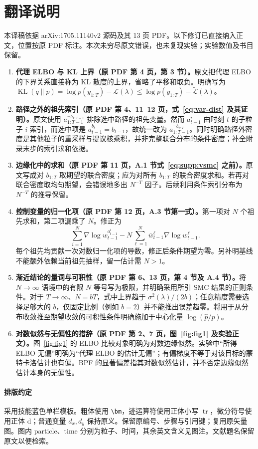 \clearpage
\section*{翻译说明}
\label{translation:notes}
本译稿依据 arXiv:1705.11140v2 源码及其 13 页 PDF。以下修订已直接纳入正文，位置按原 PDF 标注。本次未穷尽原文错误，也未复现实验；实验数值及书目保留。

\begin{enumerate}
\item \textbf{代理 ELBO 与 KL 上界（原 PDF 第 4 页，第 3 节）。}原文把代理 ELBO 的下界关系直接称为 KL 散度的上界，省略了平移和取负。明确写为 $\operatorname{KL}(q\|p)=\log p(y_{1:T})-\mathcal L(\lambda)\leq\log p(y_{1:T})-\widetilde{\mathcal L}(\lambda)$。
\item \textbf{路径之外的祖先索引（原 PDF 第 4、11–12 页，式~\eqref{eq:var-dist} 及其证明）。}原文使用 $a_{1:T-1}^{\neg b_{1:T-1}}$ 排除选中路径的祖先变量。然而 $a_{t-1}^i$ 由时刻 $t$ 的子粒子 $i$ 索引，而选中项是 $a_{t-1}^{b_t}=b_{t-1}$，故统一改为 $a_{1:T-1}^{\neg b_{2:T}}$。同时明确路径外密度是其他粒子的重采样与提议核乘积，并非完整联合分布的条件密度；补全附录末步的索引求和依据。
\item \textbf{边缘化中的求和（原 PDF 第 11 页，A.1 节式~\eqref{eq:supp:vsmc} 之前）。}原文写成对 $b_{1:T}$ 取期望的联合密度；应为对所有 $b_{1:T}$ 的联合密度求和。若再对联合密度取均匀期望，会错误地多出 $N^{-T}$ 因子。后续利用条件索引分布为 $N^{-T}$ 的推导保留。
\item \textbf{控制变量的归一化项（原 PDF 第 12 页，A.3 节第一式）。}第一项对 $N$ 个祖先求和，第二项漏乘了 $N$。修正为
\[
\sum_{i=1}^N\nabla\log w_{t-1}^{a_{t-1}^i}
-N\sum_{\ell=1}^N\bar w_{t-1}^{\ell}\nabla\log w_{t-1}^{\ell}.
\]
每个祖先均贡献一次对数归一化项的导数，修正后条件期望为零。另补明基线不能额外依赖当前祖先抽样，留一估计需 $N>1$。
\item \textbf{渐近结论的量词与可积性（原 PDF 第 6、13 页，第 4 节及 A.4 节）。}将 $N\to\infty$ 语境中的有限 $N$ 等号写为极限，并明确采用所引 SMC 结果的正则条件。对于 $T\to\infty$、$N=bT$，式中上界趋于 $\sigma^2(\lambda)/(2b)$；任意精度需要选择足够大的 $b$，仅固定比例（例如 $b=2$）并不能推出误差趋零。将用于从分布收敛推至期望收敛的可积性条件明确施加于中心化量 $\log(\widehat p/p)$。
\item \textbf{对数似然与无偏性的措辞（原 PDF 第 2、7 页，图~\ref{fig:fig1} 及实验正文）。}图~\ref{fig:fig1} 的 ELBO 比较对象明确为对数边缘似然。实验中“所得 ELBO 无偏”明确为“代理 ELBO 的估计无偏”；有偏梯度不等于对该目标的蒙特卡洛估计也有偏。BPF 的显著偏差指其对数似然估计，并不否定边缘似然估计本身的无偏性。
\end{enumerate}

\paragraph{排版约定}
采用技能蓝色单栏模板。粗体使用 \verb|\bm|，迹运算符使用正体小写 $\operatorname{tr}$，微分符号使用正体 $\mathrm d$；普通变量 $d_x,d_y$ 保持原义。保留原编号、步骤与引用键；复用原矢量图。图内 particle、time 分别为粒子、时间，其余英文含义见图注。文献题名保留原文以便检索。
